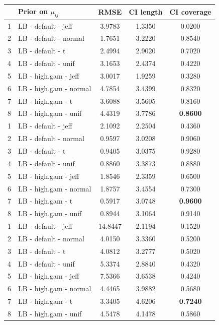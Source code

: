 \documentclass{amsart}
\begin{document}
\begin{table}[ht]
\centering
\begin{tabular}{l|l|ccc}
  \toprule
 & Prior on $\mu_{ij}$ & RMSE & CI length & CI coverage \\ 
  \midrule
1 & LB - default - jeff & 3.9783 & 1.3350 & 0.0200 \\ 
  2 & LB - default - normal & 1.7651 & 3.2220 & 0.8540 \\ 
  3 & LB - default - t & 2.4994 & 2.9020 & 0.7020 \\ 
  4 & LB - default - unif & 3.1653 & 2.4374 & 0.4220 \\ 
  5 & LB - high.gam - jeff & 3.0017 & 1.9259 & 0.3280 \\ 
  6 & LB - high.gam - normal & 4.7854 & 3.4399 & 0.8320 \\ 
  7 & LB - high.gam - t & 3.6088 & 3.5605 & 0.8160 \\ 
  8 & LB - high.gam - unif & 4.4319 & 3.7786 & \textbf{0.8600} \\ 
   \midrule
1 & LB - default - jeff & 2.1092 & 2.2504 & 0.4360 \\ 
  2 & LB - default - normal & 0.9597 & 3.0208 & 0.9060 \\ 
  3 & LB - default - t & 0.9405 & 3.0375 & 0.9280 \\ 
  4 & LB - default - unif & 0.8860 & 3.3873 & 0.8880 \\ 
  5 & LB - high.gam - jeff & 1.8546 & 2.3359 & 0.6500 \\ 
  6 & LB - high.gam - normal & 1.8757 & 3.4554 & 0.7300 \\ 
  7 & LB - high.gam - t & 0.5917 & 3.0748 & \textbf{0.9600} \\ 
  8 & LB - high.gam - unif & 0.8944 & 3.1064 & 0.9140 \\ 
   \midrule
1 & LB - default - jeff & 14.8447 & 2.1194 & 0.1520 \\ 
  2 & LB - default - normal & 4.0150 & 3.3360 & 0.5200 \\ 
  3 & LB - default - t & 4.0812 & 3.2777 & 0.5020 \\ 
  4 & LB - default - unif & 5.3374 & 2.8840 & 0.4320 \\ 
  5 & LB - high.gam - jeff & 7.5366 & 3.6538 & 0.4240 \\ 
  6 & LB - high.gam - normal & 4.4465 & 3.9882 & 0.5680 \\ 
  7 & LB - high.gam - t & 3.3405 & 4.6206 & \textbf{0.7240} \\ 
  8 & LB - high.gam - unif & 4.5478 & 4.1478 & 0.5860 \\  

\end{tabular}
\end{table}
\end{document}
